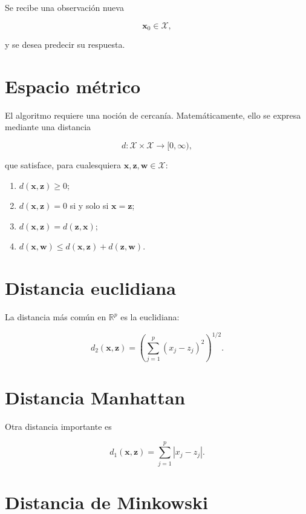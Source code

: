 \documentclass[
  spanish,
  11pt,
  letterpaper,
  DIV=11,
  numbers=noendperiod]{scrreprt}
\providecommand{\tightlist}{%
  \setlength{\itemsep}{0pt}\setlength{\parskip}{0pt}}
\theoremstyle{definition}
\theoremstyle{plain}
\theoremstyle{definition}
\theoremstyle{remark}
\begin{document}
Se recibe una observación nueva

\[
\mathbf{x}_0\in\mathcal{X},
\]

y se desea predecir su respuesta.

\section{Espacio métrico}\label{espacio-muxe9trico}

El algoritmo requiere una noción de cercanía. Matemáticamente, ello se
expresa mediante una distancia

\[
d:\mathcal{X}\times\mathcal{X}\to[0,\infty),
\]

que satisface, para cualesquiera
\(\mathbf{x},\mathbf{z},\mathbf{w}\in\mathcal{X}\):

\begin{enumerate}
\def\labelenumi{\arabic{enumi}.}
\tightlist
\item
  \(d(\mathbf{x},\mathbf{z})\ge 0\);
\item
  \(d(\mathbf{x},\mathbf{z})=0\) si y solo si \(\mathbf{x}=\mathbf{z}\);
\item
  \(d(\mathbf{x},\mathbf{z})=d(\mathbf{z},\mathbf{x})\);
\item
  \(d(\mathbf{x},\mathbf{w})\le d(\mathbf{x},\mathbf{z})+d(\mathbf{z},\mathbf{w})\).
\end{enumerate}

\section{Distancia euclidiana}\label{distancia-euclidiana-1}

La distancia más común en \(\mathbb{R}^p\) es la euclidiana:

\[
d_2(\mathbf{x},\mathbf{z})
=
\left(
\sum_{j=1}^{p}(x_j-z_j)^2
\right)^{1/2}.
\]

\section{Distancia Manhattan}\label{distancia-manhattan}

Otra distancia importante es

\[
d_1(\mathbf{x},\mathbf{z})
=
\sum_{j=1}^{p}|x_j-z_j|.
\]

\section{Distancia de Minkowski}\label{distancia-de-minkowski}
\end{document}
